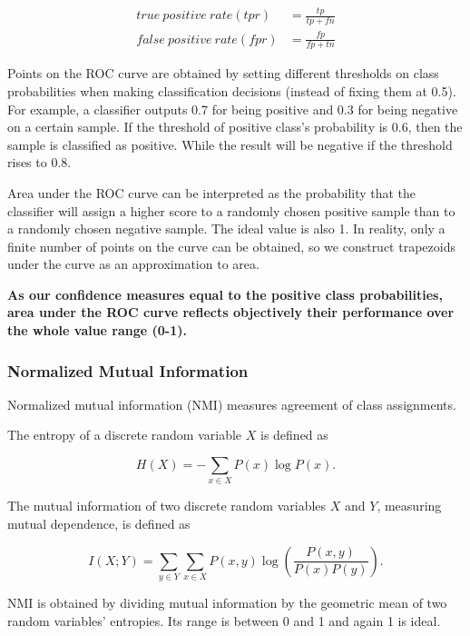\documentclass[11pt,a4paper,titlepage]{article}
\begin{document}
\begin{align*}
  true\ positive\ rate (tpr) & = \frac{tp}{tp+fn} \\
  false\ positive\ rate (fpr) & = \frac{fp}{fp+tn}
\end{align*}

Points on the ROC curve are obtained by setting different thresholds on class probabilities when making classification decisions (instead of fixing them at 0.5).
For example, a classifier outputs 0.7 for being positive and 0.3 for being negative on a certain sample.
If the threshold of positive class's probability is 0.6, then the sample is classified as positive.
While the result will be negative if the threshold rises to 0.8.

Area under the ROC curve can be interpreted as the probability that the classifier will assign a higher score to a randomly chosen positive sample than to a randomly chosen negative sample.
The ideal value is also 1.
In reality, only a finite number of points on the curve can be obtained, so we construct trapezoids under the curve as an approximation to area.

\textbf{As our confidence measures equal to the positive class probabilities, area under the ROC curve reflects objectively their performance over the whole value range (0-1).}

\subsubsection*{Normalized Mutual Information}

Normalized mutual information (NMI) measures agreement of class assignments.

The entropy of a discrete random variable \(X\) is defined as

\begin{equation*}
  H(X) = - \sum_{x \in X} P(x) \log P(x).
\end{equation*}

The mutual information of two discrete random variables \(X\) and \(Y\), measuring mutual dependence, is defined as

\begin{equation*}
  I(X;Y) = \sum_{y \in Y} \sum_{x \in X} P(x,y) \log \left(\frac{P(x,y)}{P(x)P(y)}\right).
\end{equation*}

NMI is obtained by dividing mutual information by the geometric mean of two random variables' entropies.
Its range is between 0 and 1 and again 1 is ideal.
\end{document}
